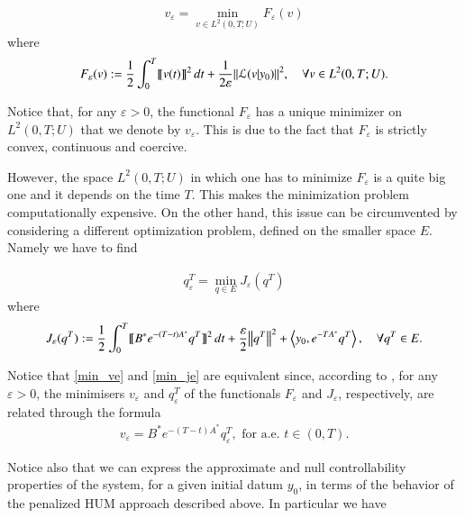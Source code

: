 \begin{align}\label{min_ve}
	v_\varepsilon=\min_{v\in L^2(0,T;U)} F_\varepsilon (v)
\end{align}
where
\begin{align*}
	F_\varepsilon(v):=\frac{1}{2}\int_0^T\llbracket v(t)\rrbracket^2\,dt+\frac{1}{2\varepsilon}{\left\|\mathcal L(v|y_0)\right\|}_{}^2, \quad \forall v\in L^2(0,T;U).
\end{align*}

Notice that, for any $\varepsilon > 0$, the functional $F_\varepsilon$ has a unique minimizer on $L^2(0,T;U)$  that we denote by $v_\varepsilon$. This is due to the fact that $F_\varepsilon$ is strictly convex, continuous and coercive. 

However, the space $L^2(0,T;U)$ in which one has to minimize $F_\varepsilon$ is a quite big one and it depends on the time $T$. This makes the minimization problem computationally expensive. On the other hand, this issue can be circumvented by considering a different optimization problem, defined on the smaller space $E$. Namely we have to find  

\begin{align}\label{min_je}
	q^T_\varepsilon=\min_{q\in E} J_\varepsilon (q^T)
\end{align}
where
\begin{align}\label{penalized_fun}
	J_\varepsilon(q^T):=\frac{1}{2}\int_0^T\llbracket B^*e^{-(T-t)A^*}q^T\rrbracket^2\,dt+\frac{\varepsilon}{2}{\left\|q^T\right\|}_{}^2 + \left\langle y_0,e^{-TA^*}q^T\right\rangle, \quad \forall q^T\in E.
\end{align}

Notice that \eqref{min_ve} and \eqref{min_je} are equivalent since, according to \cite[Proposition 1.5]{boyer2013penalised}, for any $\varepsilon > 0$, the minimisers $v_\varepsilon$ and $q_\varepsilon^T$ of the functionals $F_\varepsilon$ and $J_\varepsilon$, respectively, are related through the formula
\begin{align*}
	v_\varepsilon = B^*e^{-(T-t)A^*}q_\varepsilon^T, \textrm{ for a.e. } t\in(0,T).
\end{align*} 

Notice also that we can express the approximate and null controllability properties of the system, for a given initial datum $y_0$, in terms of the behavior of the penalized HUM approach described above. In particular we have 


